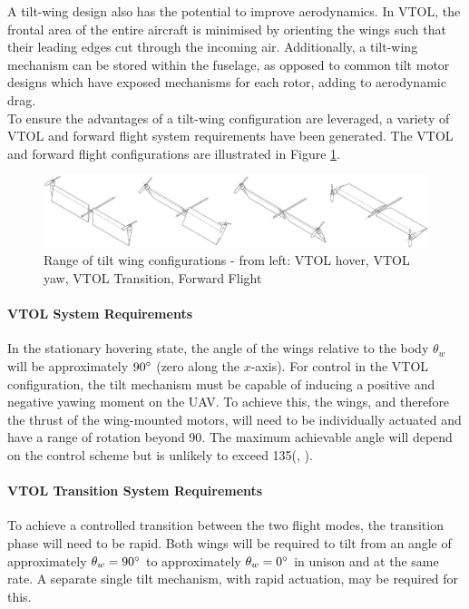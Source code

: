 A tilt-wing design also has the potential to improve aerodynamics. In VTOL, the frontal area of the entire aircraft is minimised by orienting the wings such that their leading edges cut through the incoming air. Additionally, a tilt-wing mechanism can be stored within the fuselage, as opposed to common tilt motor designs which have exposed mechanisms for each rotor, adding to aerodynamic drag. \\

To ensure the advantages of a tilt-wing configuration are leveraged, a variety of VTOL and forward flight system requirements have been generated. The VTOL and forward flight configurations are illustrated in Figure \ref{fig:configs}.\\
\begin{figure}[H]
    \centering
    \includegraphics[width = \textwidth]{Tiltwing/TiltWingConfigurations.png}
    \caption[Range of tilt wing configurations]{Range of tilt wing configurations - from left: VTOL hover, VTOL yaw, VTOL Transition, Forward Flight}
    \label{fig:configs}
\end{figure}

\paragraph{VTOL System Requirements}
In the stationary hovering state, the angle of the wings relative to the body \(\theta_w\) will be approximately \(90\degree\) (zero along the $x$-axis). For control in the VTOL configuration, the tilt mechanism must be capable of inducing a positive and negative yawing moment on the UAV. To achieve this, the wings, and therefore the thrust of the wing-mounted motors, will need to be individually actuated and have a range of rotation beyond 90\degree. The maximum achievable angle will depend on the control scheme but is unlikely to exceed 135\degree (\citeauthor{inproceedings}, \citeyear{inproceedings}). \\

\paragraph{VTOL Transition System Requirements}
To achieve a controlled transition between the two flight modes, the transition phase will need to be rapid. Both wings will be required to tilt from an angle of approximately \(\theta_w=90\degree\) to approximately \(\theta_w=0\degree\) in unison and at the same rate. A separate single tilt mechanism, with rapid actuation, may be required for this.\\

